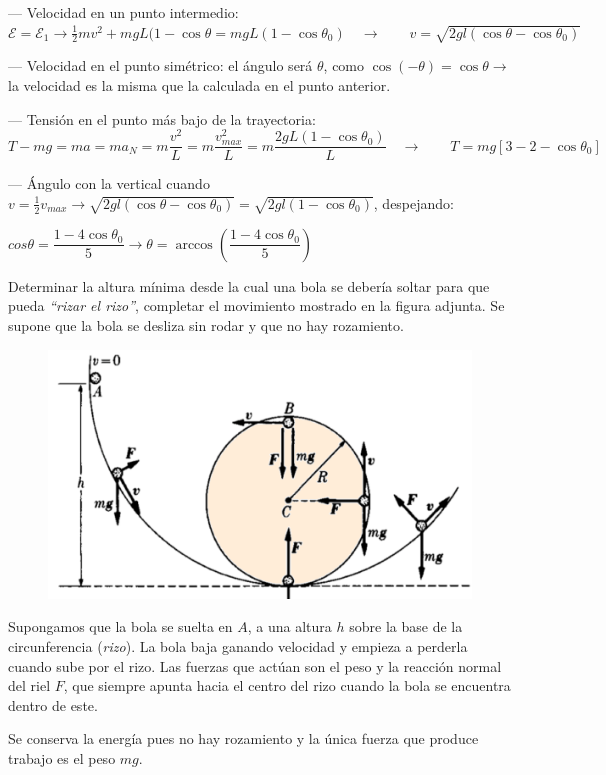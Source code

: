 --- Velocidad en un punto intermedio: $\mathcal E=\mathcal E_1 \to \frac 1 2 m v^2+mgL(1-\cos \theta= mgL(1-\cos \theta_0) \quad \to \qquad v=\sqrt{2gl(\cos \theta-\cos \theta_0)}$

--- Velocidad en el punto simétrico: el ángulo será $\theta$, como $\cos (-\theta)=\cos \theta \to $ la velocidad es la misma que la calculada en el punto anterior.

--- Tensión en el punto más bajo de la trayectoria: $T-mg=ma=ma_N=m\dfrac {v^2}{L}=m\dfrac{v_{max}^2}{L}=m\dfrac{2gL(1-\cos \theta_0)}{L} \quad \to \qquad T=mg\left[ 3-2-\cos \theta_0 \right]$

--- Ángulo con la vertical cuando $v=\frac {1}{2}v_{max} \to  \sqrt{2gl(\cos \theta-\cos \theta_0)}=\sqrt{2gl(1-\cos \theta_0)}$, despejando: 

$ cos \theta=\dfrac {1-4\cos \theta_0}{5} \to  \theta= \arccos \left( \dfrac {1-4\cos \theta_0}{5}\right)$


\begin{prob}
\begin{multicols}{2}
Determinar la altura mínima desde la cual una bola se debería soltar para que pueda \emph{``rizar el rizo''}, completar el movimiento mostrado en la figura adjunta. Se supone que la bola se desliza sin rodar y que no hay rozamiento.	
\begin{figure}[H]
	\centering
	\includegraphics[width=.55\textwidth]{imagenes/imagenes04/T04IM16.png}
\end{figure}
\end{multicols}
\end{prob}
Supongamos que la bola se suelta en $A$, a una altura $h$ sobre la base de la circunferencia (\emph{rizo}). La bola baja ganando velocidad y empieza a perderla cuando sube por el rizo. Las fuerzas que actúan son el peso y la reacción normal del riel $F$, que siempre apunta hacia el centro del rizo cuando la bola se encuentra dentro de este. 

Se conserva la energía pues no hay rozamiento y la única fuerza que produce trabajo es el peso $mg$.

